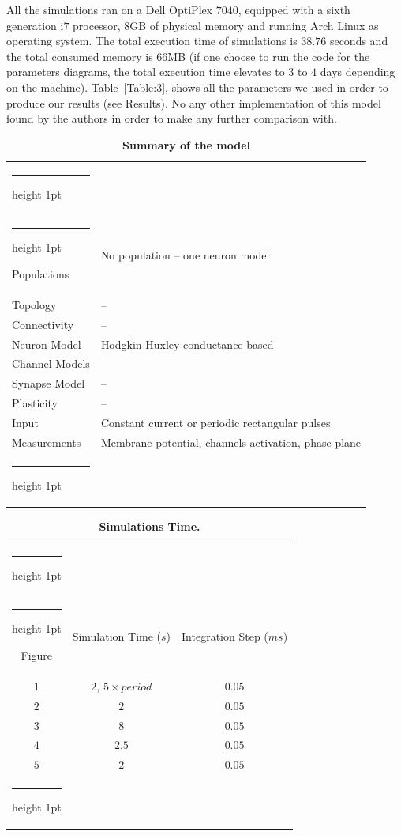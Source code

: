 \documentclass[10pt,a4paper,onecolumn]{article}
\makeatletter
\newcommand{\thickhline}{%
    \noalign {\ifnum 0=`}\fi \hrule height 1pt
    \futurelet \reserved@a \@xhline
}
\makeatother
\begin{document}
All the simulations ran on a Dell OptiPlex $7040$, equipped with a sixth
generation i$7$ processor, $8$GB of physical memory and running Arch Linux
as operating system. The total execution time of simulations is $38.76$
seconds and the total consumed memory is $66$MB (if one choose to run 
the code for the parameters diagrams, the total execution time elevates 
to $3$ to $4$ days depending on the machine). Table~\ref{Table:3}, shows
all the parameters we used in order to produce our results (see Results). 
No any other implementation of this model found by the authors in order 
to make any further comparison with.  
\begin{table}[!htbp]
    \centering
    \begin{tabular}{ll}
        \thickhline
        \multicolumn{2}{c}{Model Summary} \\\thickhline
        \rowcolor{Gray}
        Populations  & No population -- one neuron model \\\rowcolor{LightGray}
        Topology     & -- \\ \rowcolor{Gray}
        Connectivity & -- \\ \rowcolor{LightGray}
        Neuron Model & Hodgkin-Huxley conductance-based \\\rowcolor{Gray}
        Channel Models & \\ \rowcolor{LightGray}
        Synapse Model & -- \\ \rowcolor{Gray}
        Plasticity & -- \\ \rowcolor{LightGray}
        Input & Constant current or periodic rectangular pulses \\\rowcolor{Gray}
        Measurements & Membrane potential, channels activation, phase plane \\
        \thickhline
    \end{tabular}
    \caption{{\bfseries \sffamily Summary of the model}} 
    \label{Table:1}
\end{table}

\begin{table}[!htbp]
    \centering
    \begin{tabular}{ccc}
        \thickhline
        \multicolumn{3}{c}{Simulation Time} \\ \thickhline
        Figure & Simulation Time ($s$) & Integration Step ($ms$) \\ \rowcolor{LightGray}
        $1$ & $2$, $5\times period$ & $0.05$ \\ \rowcolor{Gray}
        $2$ & $2$ & $0.05$ \\ \rowcolor{LightGray} 
        $3$ & $8$ & $0.05$  \\ \rowcolor{Gray} 
        $4$ & $2.5$ & $0.05$  \\ \rowcolor{LightGray}  
        $5$ & $2$ & $0.05$  \\ \thickhline
    \end{tabular}
    \caption{{\bfseries \sffamily Simulations Time.}}
    \label{Table:2}
\end{table}
\end{document}
